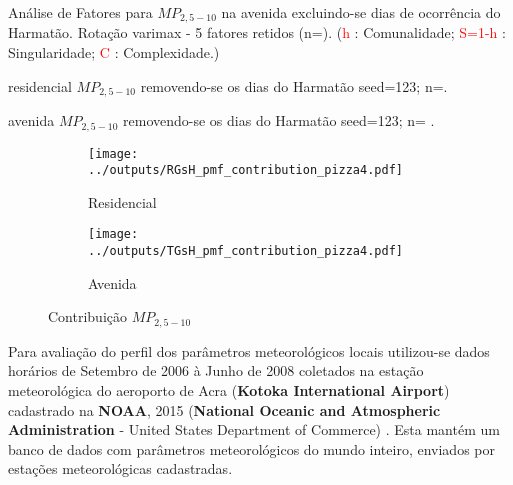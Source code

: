 \begin{table}[H]
  
  \caption{Análise de Fatores para $MP_{2,5-10}$ na avenida
           excluindo-se dias de ocorrência do Harmatão.
           Rotação varimax - 5 fatores retidos (n=).
           (\textcolor{red}{h} : Comunalidade; 
           \textcolor{red}{S=1-h} : Singularidade; 
           \textcolor{red}{C} : Complexidade.)
           \label{table:loadings_TGsH4}}
\end{table}

\begin{table}[H]
  \centering
    
    \caption{residencial $MP_{2,5-10}$ removendo-se os dias do Harmatão 
              seed=123; n=. 
             \label{table:RGsH_profiles4}}
\end{table}

\begin{table}[H]
  \centering
    
    \caption{avenida $MP_{2,5-10}$ removendo-se os dias do Harmatão 
              seed=123; n= . 
             \label{table:TGsH_profiles4}}
\end{table}


\begin{figure}[H]
  \centering
  \begin{subfigure}[b]{0.45\textwidth}
    \texttt{[image: ../outputs/RGsH\_pmf\_contribution\_pizza4.pdf]}
    \caption{Residencial}
  \end{subfigure}%
  \begin{subfigure}[b]{0.45\textwidth}
    \texttt{[image: ../outputs/TGsH\_pmf\_contribution\_pizza4.pdf]}
    \caption{Avenida}
  \end{subfigure}
  \caption{Contribuição $MP_{2,5-10}$ \label{qqq}}
\end{figure}


Para avaliação do perfil dos parâmetros meteorológicos locais
utilizou-se dados horários de Setembro de 2006 à Junho de 2008 
coletados na estação meteorológica do aeroporto de Acra 
(\textbf{Kotoka International Airport}) cadastrado na \textbf{NOAA}, 2015 (\textbf{National Oceanic 
and Atmospheric Administration} - United States Department of Commerce)%
. Esta mantém um banco de dados com parâmetros 
meteorológicos do mundo inteiro, enviados por estações meteorológicas 
cadastradas.


